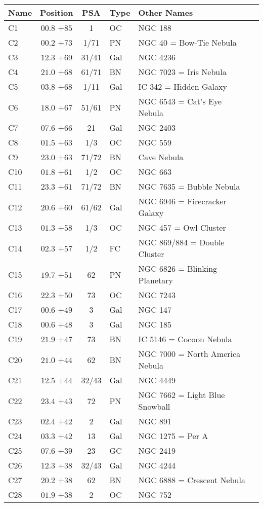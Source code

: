 \begin{table}[p]
\setlength{\tabcolsep}{3pt}
\small
\begin{tabular}{lcclll}
\hline
Name&Position&PSA&Type&Other Names\\
\hline
C1   &$00.8$ $+85$&1&OC &NGC 188\\
C2   &$00.2$ $+73$&1/71&PN &NGC 40 = Bow-Tie Nebula\\
C3   &$12.3$ $+69$&31/41&Gal&NGC 4236\\
C4   &$21.0$ $+68$&61/71&BN &NGC 7023 = Iris Nebula\\
C5   &$03.8$ $+68$&1/11&Gal&IC 342 = Hidden Galaxy\\
C6   &$18.0$ $+67$&51/61&PN &NGC 6543 = Cat's Eye Nebula\\
C7   &$07.6$ $+66$&21&Gal&NGC 2403\\
C8   &$01.5$ $+63$&1/3&OC &NGC 559\\
C9   &$23.0$ $+63$&71/72&BN &Cave Nebula\\
C10  &$01.8$ $+61$&1/2&OC &NGC 663\\
C11  &$23.3$ $+61$&71/72&BN &NGC 7635 = Bubble Nebula\\
C12  &$20.6$ $+60$&61/62&Gal&NGC 6946 = Firecracker Galaxy\\
C13  &$01.3$ $+58$&1/3&OC &NGC 457 = Owl Cluster\\
C14  &$02.3$ $+57$&1/2&FC &NGC 869/884 = Double Cluster\\
C15  &$19.7$ $+51$&62&PN &NGC 6826 = Blinking Planetary\\
C16  &$22.3$ $+50$&73&OC &NGC 7243\\
C17  &$00.6$ $+49$&3&Gal&NGC 147\\
C18  &$00.6$ $+48$&3&Gal&NGC 185\\
C19  &$21.9$ $+47$&73&BN &IC 5146 = Cocoon Nebula\\
C20  &$21.0$ $+44$&62&BN &NGC 7000 = North America Nebula\\
C21  &$12.5$ $+44$&32/43&Gal&NGC 4449\\
C22  &$23.4$ $+43$&72&PN &NGC 7662 = Light Blue Snowball\\
C23  &$02.4$ $+42$&2&Gal&NGC 891\\
C24  &$03.3$ $+42$&13&Gal&NGC 1275 = Per A\\
C25  &$07.6$ $+39$&23&GC &NGC 2419\\
C26  &$12.3$ $+38$&32/43&Gal&NGC 4244\\
C27  &$20.2$ $+38$&62&BN &NGC 6888 = Crescent Nebula\\
C28  &$01.9$ $+38$&2&OC &NGC 752\\

\end{tabular}
\end{table}
